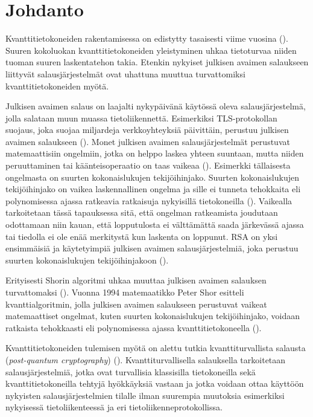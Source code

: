 \chapter{Johdanto\label{intro}}
Kvanttitietokoneiden rakentamisessa on edistytty tasaisesti viime vuosina (\cite{alagic2020status}). Suuren kokoluokan kvanttitietokoneiden yleistyminen uhkaa tietoturvaa niiden tuoman suuren laskentatehon takia. Etenkin nykyiset julkisen avaimen salaukseen liittyvät salausjärjestelmät ovat uhattuna muuttua turvattomiksi kvanttitietokoneiden myötä.

Julkisen avaimen salaus on laajalti nykypäivänä käytössä oleva salausjärjestelmä, jolla salataan muun muassa tietoliikennettä. Esimerkiksi TLS-protokollan suojaus, joka suojaa miljardeja verkkoyhteyksiä päivittäin, perustuu julkisen avaimen salaukseen (\cite{buchmann2016post}). %
Monet julkisen avaimen salausjärjestelmät perustuvat matemaattisiin ongelmiin, jotka on helppo laskea yhteen suuntaan, mutta niiden peruuttaminen tai käänteisoperaatio on taas vaikeaa (\cite{mavroeidis2018impact}). Esimerkki tällaisesta ongelmasta on suurten kokonaislukujen tekijöihinjako. Suurten kokonaislukujen tekijöihinjako on vaikea laskennallinen ongelma ja sille ei tunneta tehokkaita eli polynomisessa ajassa ratkeavia ratkaisuja nykyisillä tietokoneilla (\cite{doi:10.1137/S0036144598347011}). Vaikealla tarkoitetaan tässä tapauksessa sitä, että ongelman ratkeamista joudutaan odottamaan niin kauan, että lopputulosta ei välttämättä saada järkevässä ajassa tai tiedolla ei ole enää merkitystä kun laskenta on loppunut. %
RSA on yksi ensimmäisiä ja käytetyimpiä julkisen avaimen salausjärjestelmiä, joka perustuu suurten kokonaislukujen tekijöihinjakoon (\cite{montgomery1994survey}).

Erityisesti Shorin algoritmi uhkaa muuttaa julkisen avaimen salauksen turvattomaksi (\cite{mavroeidis2018impact}). Vuonna 1994 matemaatikko Peter Shor esitteli kvanttialgoritmin, jolla julkisen avaimen salaukseen perustuvat vaikeat matemaattiset ongelmat, kuten suurten kokonaislukujen tekijöihinjako, voidaan ratkaista tehokkaasti eli polynomisessa ajassa kvanttitietokoneella (\cite{doi:10.1137/S0036144598347011}).

Kvanttitietokoneiden tulemisen myötä on alettu tutkia kvanttiturvallista salausta (\emph{post-quantum cryptography}) (\cite{alagic2020status}). Kvanttiturvallisella salauksella tarkoitetaan salausjärjestelmiä, jotka ovat turvallisia klassisilla tietokoneilla sekä kvanttitietokoneilla tehtyjä hyökkäyksiä vastaan ja jotka voidaan ottaa käyttöön nykyisten salausjärjestelmien tilalle ilman suurempia muutoksia esimerkiksi nykyisessä tietoliikenteessä ja eri tietoliikenneprotokollissa.

